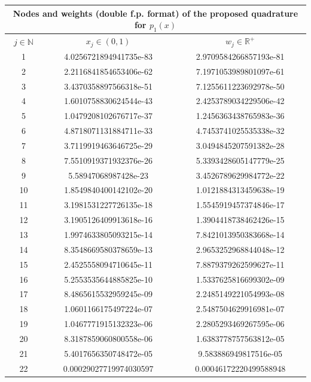 \documentclass[a4paper, twosided]{book}
\begin{document}
\newpage

\begin{table}[H]
\centering
\begin{tabular}{|c||c|c|}
\hline
\multicolumn{3}{|c|}{\textbf{Nodes and weights (double f.p. format) of the proposed quadrature for $p_1(x)$ }} \\
\hline
$j\in\mathbb{N}$ & $x_j\in(0,1)$ & $w_j\in\mathbb{R}^+$ \\
\hline
1   &  4.0256721894941735e-83  &  2.9709584266857193e-81  \\
2   &  2.2116841854653406e-62  &  7.1971053989801097e-61  \\
3   &  3.4370358897566318e-51  &  7.1255611223692978e-50  \\
4   &  1.6010758830624544e-43  &  2.4253789034229506e-42  \\
5   &  1.0479208102676717e-37  &  1.2456363438765983e-36  \\
6   &  4.8718071131884711e-33  &  4.7453741025535338e-32  \\
7   &  3.7119919463646725e-29  &  3.0494845207591382e-28  \\
8   &  7.5510919371932376e-26  &  5.3393428605147779e-25  \\
9   &  5.58947068987428e-23    &  3.4526789629984772e-22  \\
10  &  1.8549840400142102e-20  &  1.0121884313459638e-19  \\
11  &  3.1981531227726135e-18  &  1.5545919457374846e-17  \\
12  &  3.1905126409913618e-16  &  1.3904418738462426e-15  \\
13  &  1.9974633805093215e-14  &  7.8421013950383668e-14  \\
14  &  8.3548669580378659e-13  &  2.9653252968844048e-12  \\
15  &  2.4525558094710645e-11  &  7.8879379262599627e-11  \\
16  &  5.2553535644885825e-10  &  1.5337625816699302e-09  \\
17  &  8.4865615532959245e-09  &  2.2485149221054993e-08  \\
18  &  1.0601166175497224e-07  &  2.5487504629916981e-07  \\
19  &  1.0467771915132323e-06  &  2.2805293469267595e-06  \\
20  &  8.3187859060800558e-06  &  1.6383778757563812e-05  \\
21  &  5.4017656350748472e-05  &  9.583886949817516e-05   \\
22  &  0.00029027719974030597  &  0.00046172220499588948  \\

\end{tabular}
\end{table}
\end{document}
